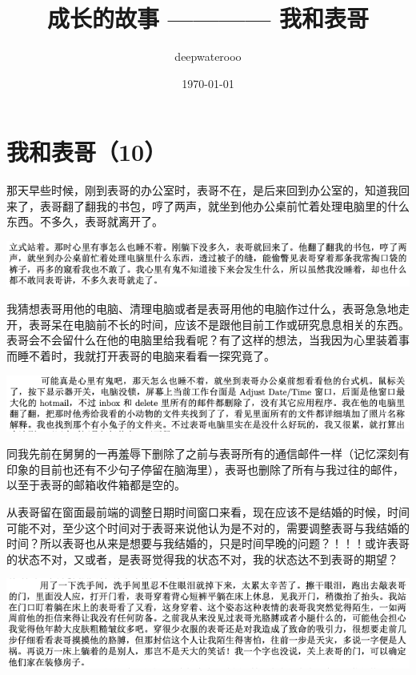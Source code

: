 \documentclass[9pt, b5paper]{article}
\author{deepwaterooo}
\date{\today}
\title{成长的故事 ———— 我和表哥}
\begin{document}
\maketitle
\tableofcontents


\section{我和表哥（10）}
\label{sec:org2d165a2}

那天早些时候，刚到表哥的办公室时，表哥不在，是后来回到办公室的，知道我回来了，表哥翻了翻我的书包，哼了两声，就坐到他办公桌前忙着处理电脑里的什么东西。不多久，表哥就离开了。

\begin{center}
\includegraphics[width=.9\linewidth]{./pic/p1p67-0.png}
\end{center}

我猜想表哥用他的电脑、清理电脑或者是表哥用他的电脑作过什么，表哥急急地走开，表哥呆在电脑前不长的时间，应该不是跟他目前工作或研究息息相关的东西。表哥会不会留什么在他的电脑里给我看呢？有了这样的想法，当我因为心里装着事而睡不着时，我就打开表哥的电脑来看看一探究竟了。 

\begin{center}
\includegraphics[width=.9\linewidth]{./pic/p1p67-8.png}
\end{center}

同我先前在舅舅的一再羞辱下删除了之前与表哥所有的通信邮件一样（记忆深刻有印象的目前也还有不少句子停留在脑海里），表哥也删除了所有与我过往的邮件，以至于表哥的邮箱收件箱都是空的。 

从表哥留在窗面最前端的调整日期时间窗口来看，现在应该不是结婚的时候，时间可能不对，至少这个时间对于表哥来说他认为是不对的，需要调整表哥与我结婚的时间？所以表哥也从来是想要与我结婚的，只是时间早晚的问题？！！！或许表哥的状态不对，又或者，是表哥觉得我的状态不对，我的状态达不到表哥的期望？

\begin{center}
\includegraphics[width=.9\linewidth]{./pic/p1p67-6.png}
\end{center}
\end{document}
